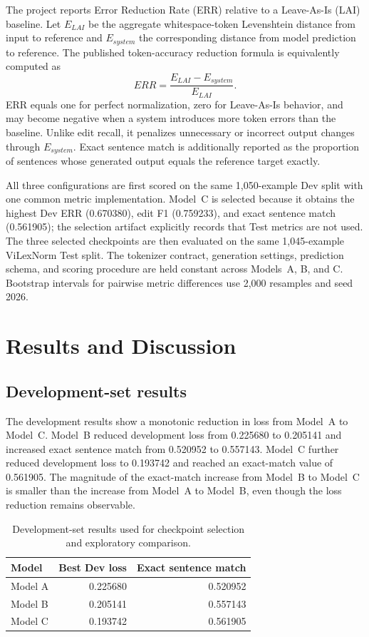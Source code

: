 \documentclass[11pt]{article}
\begin{document}
The project reports Error Reduction Rate (ERR) relative to a Leave-As-Is (LAI) baseline. Let $E_{LAI}$ be the aggregate whitespace-token Levenshtein distance from input to reference and $E_{system}$ the corresponding distance from model prediction to reference. The published token-accuracy reduction formula is equivalently computed as
\begin{equation}
ERR=\frac{E_{LAI}-E_{system}}{E_{LAI}}.
\end{equation}
ERR equals one for perfect normalization, zero for Leave-As-Is behavior, and may become negative when a system introduces more token errors than the baseline. Unlike edit recall, it penalizes unnecessary or incorrect output changes through $E_{system}$. Exact sentence match is additionally reported as the proportion of sentences whose generated output equals the reference target exactly.

All three configurations are first scored on the same 1,050-example Dev split with one common metric implementation. Model~C is selected because it obtains the highest Dev ERR (0.670380), edit F1 (0.759233), and exact sentence match (0.561905); the selection artifact explicitly records that Test metrics are not used. The three selected checkpoints are then evaluated on the same 1,045-example ViLexNorm Test split. The tokenizer contract, generation settings, prediction schema, and scoring procedure are held constant across Models~A, B, and C. Bootstrap intervals for pairwise metric differences use 2,000 resamples and seed 2026.

\section{Results and Discussion}

\subsection{Development-set results}

The development results show a monotonic reduction in loss from Model~A to Model~C. Model~B reduced development loss from 0.225680 to 0.205141 and increased exact sentence match from 0.520952 to 0.557143. Model~C further reduced development loss to 0.193742 and reached an exact-match value of 0.561905. The magnitude of the exact-match increase from Model~B to Model~C is smaller than the increase from Model~A to Model~B, even though the loss reduction remains observable.

\begin{table}[t]
\centering
\caption{Development-set results used for checkpoint selection and exploratory comparison.}
\label{tab:dev-results}
\begin{tabular}{lrr}
\toprule
Model & Best Dev loss & Exact sentence match \\
\midrule
Model A & 0.225680 & 0.520952 \\
Model B & 0.205141 & 0.557143 \\
Model C & 0.193742 & 0.561905 \\
\bottomrule
\end{tabular}
\end{table}
\end{document}
